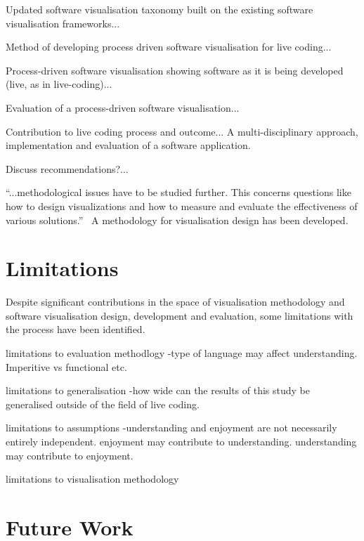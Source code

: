 
Updated software visualisation taxonomy built on the existing software visualisation frameworks...

Method of developing process driven software visualisation for live coding...

Process-driven software visualisation showing software as it is being developed (live, as in live-coding)...

Evaluation of a process-driven software visualisation...

Contribution to live coding process and outcome... A multi-disciplinary approach, implementation and evaluation of a software application.

Discuss recommendations?...

``...methodological issues have to be studied further. This concerns questions like how to design visualizations and how to measure and evaluate the effectiveness of various solutions.''~\cite{VanWijk2005} A methodology for visualisation design has been developed.


\section{Limitations}

Despite significant contributions in the space of visualisation methodology and software visualisation design, development and evaluation, some limitations with the process have been identified.

limitations to evaluation methodlogy
-type of language may affect understanding. Imperitive vs functional etc.

limitations to generalisation
-how wide can the results of this study be generalised outside of the field of live coding.

limitations to assumptions
-understanding and enjoyment are not necessarily entirely independent. enjoyment may contribute to understanding. understanding may contribute to enjoyment.

limitations to visualisation methodology

\section{Future Work}


